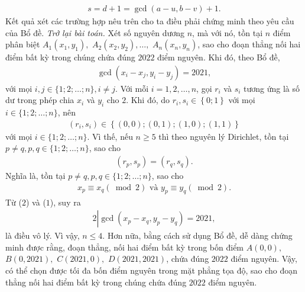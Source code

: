 \begin{multicols}{2}
	\begin{align*}
		s = d + 1 = \gcd(a - u, b - v) + 1.
	\end{align*}
	Kết quả xét các trường hợp nêu trên cho ta điều phải chứng minh theo yêu cầu của Bổ đề.
	\vskip 0.05cm
	\textit{Trở lại bài toán.}
	\vskip 0.05cm
	Xét số nguyên dương $n$, mà với nó, tồn tại $n$ điểm phân biệt  ${A_1}\left( {{x_1},{y_1}} \right),$ ${A_2}\left( {{x_2},{y_2}} \right), \ldots ,$ ${A_n}\left( {{x_n},{y_n}} \right)$, sao cho đoạn thẳng nối hai điểm bất kỳ trong chúng chứa đúng $2022$ điểm nguyên.
	\vskip 0.05cm
	Khi đó, theo Bổ đề,
	\begin{align*}
		\gcd \left( {{x_i} - {x_j},{y_i} - {y_j}} \right) = 2021, \tag{$1$}
	\end{align*}
	với mọi $i, j \in \{1; 2; \ldots ; n\}, i \ne j$.
	\vskip 0.05cm
	Với mỗi $i = 1, 2, \ldots , n$, gọi $r_i$  và $s_i$  tương ứng là số dư trong phép chia $x_i$  và $y_i$  cho $2$.
	\vskip 0.05cm
	Khi đó, do  ${r_i},{s_i} \in \left\{ {0;1} \right\}$ với mọi \linebreak$i \in \{1; 2; \ldots ; n\}$, nên
	\begin{align*}
		\left( {{r_i},{s_i}} \right) \in \left\{ {\left( {0,0} \right);\left( {0,1} \right);\left( {1,0} \right);\left( {1,1} \right)} \right\}
	\end{align*}
	với mọi $i \in \{1; 2; \ldots ; n\}$.
	\vskip 0.05cm
	Vì thế, nếu $n \ge  5$ thì theo nguyên lý Dirichlet, tồn tại $p \ne q, p, q \in \{1; 2; \ldots ; n\}$, sao cho
	\begin{align*}
		\left( {{r_p},{s_p}} \right) = \left( {{r_q},{s_q}} \right).
	\end{align*}
	Nghĩa là, tồn tại $p \ne q, p, q \in \{1; 2; \ldots ; n\}$, sao cho 
	\begin{align*}
		{x_p} \equiv {x_q}\left( {\bmod 2} \right) \text{ và } {y_p} \equiv {y_q}\left( {\bmod 2} \right). \tag{$2$}
	\end{align*}
	Từ ($2$) và ($1$), suy ra
	\begin{align*}
		2\left| {\gcd \left( {{x_p} - {x_q},{y_p} - {y_q}} \right) = 2021,} \right.
	\end{align*}
	là điều vô lý. Vì vậy, $n \le 4$.
	\vskip 0.05cm
	Hơn nữa, bằng cách sử dụng Bổ đề, dễ dàng chứng minh được rằng, đoạn thẳng, nối hai điểm bất kỳ trong bốn điểm $A(0, 0),$ $B(0, 2021),$ $C(2021, 0),$ $D(2021, 2021)$, chứa đúng $2022$ điểm nguyên.
	\vskip 0.05cm
	Vậy, có thể chọn được tối đa bốn điểm nguyên trong mặt phẳng tọa độ, sao cho đoạn thẳng nối hai điểm bất kỳ trong chúng chứa đúng $2022$ điểm nguyên.

\end{multicols}
